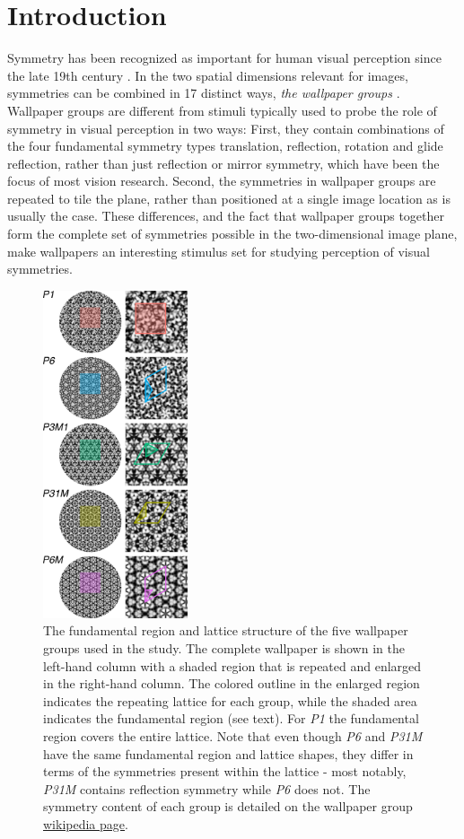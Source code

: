 \documentclass[11pt, twoside]{article}
\begin{document}
\section*{Introduction}
Symmetry has been recognized as important for human visual perception since the late 19th century \citep{mach_1959}. In the two spatial dimensions relevant for images, symmetries can be combined in 17 distinct ways, \textit{the wallpaper groups} \citep{RN1562,RN1563,RN1425}. Wallpaper groups are different from stimuli typically used to probe the role of symmetry in visual perception in two ways: First, they contain combinations of the four fundamental symmetry types translation, reflection, rotation and glide reflection, rather than just reflection or mirror symmetry, which have been the focus of most vision research. Second, the symmetries in wallpaper groups are repeated to tile the plane, rather than positioned at a single image location as is usually the case. These differences, and the fact that wallpaper groups together form the complete set of symmetries possible in the two-dimensional image plane, make wallpapers an interesting stimulus set for studying perception of visual symmetries.
\begin{figure}
	\centering
	\includegraphics[width=0.38\textwidth]{./figures/wpg_structure.pdf}
	\caption{The fundamental region and lattice structure of the five wallpaper groups used in the study. The complete wallpaper is shown in the left-hand column with a shaded region that is repeated and enlarged in the right-hand column. The colored outline in the enlarged region indicates the repeating lattice for each group, while the shaded area indicates the fundamental region (see text). For \textit{P1} the fundamental region covers the entire lattice. Note that even though \textit{P6} and \textit{P31M} have the same fundamental region and lattice shapes, they differ in terms of the symmetries present within the lattice - most notably, \textit{P31M} contains reflection symmetry while \textit{P6} does not. The symmetry content of each group is detailed on the wallpaper group \href{https://en.wikipedia.org/wiki/Wallpaper_group}{wikipedia page}.}
	\label{fig:wpg_structure}
\end{figure}
\end{document}
